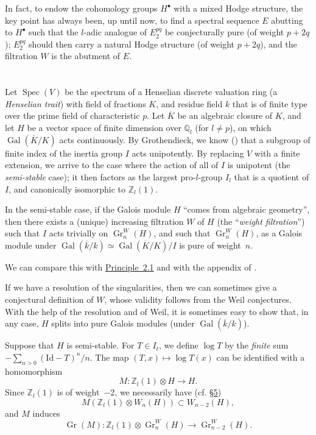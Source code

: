 \documentclass{article}
\theoremstyle{plain}
\theoremstyle{definition}
\newenvironment{principle}[1]
    {\renewcommand\theinnerprinciple{#1}\innerprinciple}
    {\endinnerprinciple}
\newcommand{\ZZ}{\mathbb{Z}}
\newcommand{\QQ}{\mathbb{Q}}
\newcommand{\Id}{\mathrm{Id}}
\DeclareMathOperator{\Gr}{Gr}
\DeclareMathOperator{\Gal}{Gal}
\DeclareMathOperator{\Spec}{Spec}
\begin{document}
In fact, to endow the cohomology groups $H^\bullet$ with a mixed Hodge structure, the key point has always been, up until now, to find a spectral sequence $E$ abutting to $H^\bullet$ such that the $l$-adic analogue of $E_2^{pq}$ be conjecturally pure (of weight $p+2q$);
$E_2^{pq}$ should then carry a natural Hodge structure (of weight $p+2q$), and the filtration $W$ is the abutment of $E$.


\section{}
\label{8}

Let $\Spec(V)$ be the spectrum of a Henselian discrete valuation ring (a \emph{Henselian trait}) with field of fractions $K$, and residue field $k$ that is of finite type over the prime field of characteristic $p$.
Let $\overline{K}$ be an algebraic closure of $K$, and let $H$ be a vector space of finite dimension over $\QQ_l$ (for $l\neq p$), on which $\Gal(\overline{K}/K)$ acts continuously.
By Grothendieck, we know (\cite[Appendix]{4}) that a subgroup of finite index of the inertia group $I$ acts unipotently.
By replacing $V$ with a finite extension, we arrive to the case where the action of all of $I$ is unipotent (the \emph{semi-stable} case);
it then factors as the largest pro-$l$-group $I_l$ that is a quotient of $I$, and canonically isomorphic to $\ZZ_l(1)$.

\begin{principle}{8.1}
  In the semi-stable case, if the Galois module $H$ ``comes from algebraic geometry'', then there exists a (unique) increasing filtration $W$ of $H$ (the ``\emph{weight filtration}'') such that $I$ acts trivially on $\Gr_n^W(H)$, and such that $\Gr_n^W(H)$, as a Galois module under $\Gal(\overline{k}/k)\simeq\Gal(\overline{K}/K)/I$ is pure of weight~$n$.
\end{principle}

We can compare this with \hyperref[principle-2.1]{Principle~2.1} and with the appendix of \cite{4}.

If we have a resolution of the singularities, then we can sometimes give a conjectural definition of $W$, whose validity follows from the Weil conjectures.
With the help of the resolution and of Weil, it is sometimes easy to show that, in any case, $H$ splits into pure Galois modules (under $\Gal(\overline{k}/k)$).

Suppose that $H$ is semi-stable.
For $T\in I_t$, we define $\log T$ by the \emph{finite} sum $-\sum_{n>0}(\Id-T)^n/n$.
The map $(T,x)\mapsto\log T(x)$ can be identified with a homomorphism
\[
\label{8.2}
  M\colon \ZZ_l(1)\otimes H \to H.
\tag{8.2}
\]
Since $\ZZ_l(1)$ is of weight~$-2$, we necessarily have (cf. \hyperref[5]{\S5})
\[
\label{8.3}
  M(\ZZ_l(1)\otimes W_n(H)) \subset W_{n-2}(H),
\tag{8.3}
\]
and $M$ induces
\[
\label{8.4}
  \Gr(M)\colon \ZZ_l(1)\otimes\Gr_n^W(H) \to \Gr_{n-2}^W(H).
\tag{8.4}
\]
\end{document}
